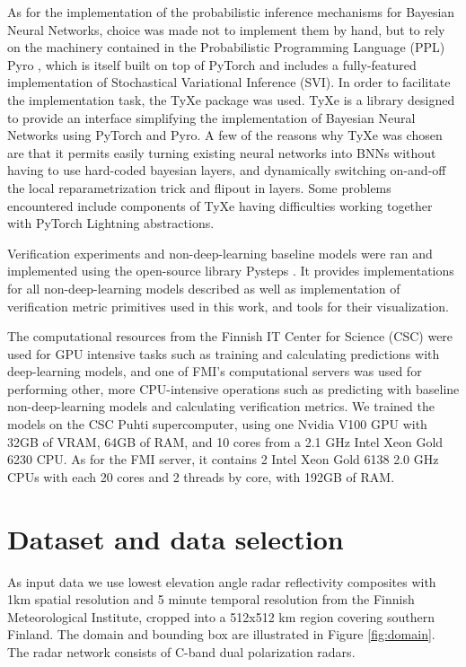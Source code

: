 As for the implementation of the probabilistic inference mechanisms for Bayesian Neural Networks, choice was made not to implement them by hand, but to rely on the machinery contained in the Probabilistic Programming Language (PPL) Pyro \cite{bingham2018pyro}, which is itself built on top of PyTorch and includes a fully-featured implementation of Stochastical Variational Inference (SVI). In order to facilitate the implementation task, the TyXe package \cite{ritter2021tyxe} was used. TyXe is a library designed to provide an interface simplifying the implementation of Bayesian Neural Networks using PyTorch and Pyro. A few of the reasons why TyXe was chosen are that it permits easily turning existing neural networks into BNNs without having to use hard-coded bayesian layers, and dynamically switching on-and-off the local reparametrization trick and flipout in layers. Some problems encountered include components of TyXe having difficulties working together with PyTorch Lightning abstractions.

Verification experiments and non-deep-learning baseline models were ran and implemented using the open-source library Pysteps \cite{pulkkinen_pysteps_2019}. It provides implementations for all non-deep-learning models described as well as implementation of verification metric primitives used in this work, and tools for their visualization. 

The computational resources from the Finnish IT Center for Science (CSC) were used for GPU intensive tasks such as training and calculating predictions with deep-learning models, and one of FMI's computational servers was used for performing other, more CPU-intensive operations such as predicting with baseline non-deep-learning models and calculating verification metrics. We trained the models on the CSC Puhti supercomputer, using one Nvidia V100 GPU with 32GB of VRAM, 64GB of RAM, and 10 cores from a 2.1 GHz Intel Xeon Gold 6230 CPU. As for the FMI server, it contains 2 Intel Xeon Gold 6138 2.0 GHz CPUs with each 20 cores and 2 threads by core, with 192GB of RAM. 

\section{Dataset and data selection}
\label{section:data}

As input data we use lowest elevation angle radar reflectivity composites with 1km spatial resolution and 5 minute temporal resolution from the Finnish Meteorological Institute, cropped into a 512x512 km region covering southern Finland. The domain and bounding box are illustrated in Figure \ref{fig:domain}. The radar network consists of C-band dual polarization radars. 

